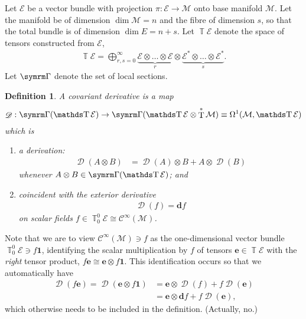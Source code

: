 \documentclass{article}
\newtheorem{definition}{Definition}
\DeclareMathOperator{\D}{\mathscr{D}}
\DeclareMathOperator{\T}{T}
\DeclareMathOperator{\TT}{\mathds T}
\renewcommand{\cal}{\mathcal}
\newcommand{\Cinf}{\cal C^\infty(\cal M)}
\renewcommand{\dd}{{\mathbf d}}
\DeclareMathOperator{\secs}{\symrm\Gamma}
\begin{document}
Let $\cal E$ be a vector bundle with projection $π : \cal E \to \cal M$ onto base manifold $\cal M$.
Let the manifold be of dimension $\dim\cal M = n$ and the fibre of dimension $s$, so that the total bundle is of dimension $\dim E = n + s$.
Let $\TT\cal E$ denote the space of tensors constructed from $\cal E$,
\begin{align}
	\TT\cal E = \bigoplus_{r,s=0}^\infty \underbrace{\cal E \otimes \dots \otimes \cal E}_r \otimes \underbrace{\cal E^* \otimes \dots \otimes \cal E^*}_s
.\end{align}
Let $\secs$ denote the set of local sections.
\begin{definition}
	A \emph{covariant derivative} is a map
	\begin{align}
		\D : \secs(\TT\cal E) \to \secs(\TT\cal E \otimes \T^*\cal M) \equiv \Omega^1(\cal M, \TT\cal E)
	\end{align}
	which is
	\begin{enumerate}
		\item a derivation:
		\begin{align}
			\D(A\otimes B) &= \D(A)\otimes B + A\otimes \D(B)
		\end{align}
		whenever $A\otimes B \in \secs(\TT \cal E)$; and

		\item coincident with the exterior derivative
		\begin{align}
			\D(f) = \dd f %
		\end{align}
		on scalar fields $f \in \TT^0_0\cal E \cong \Cinf$.
	\end{enumerate}
\end{definition}
Note that we are to view $\Cinf \ni f$ as the one-dimensional vector bundle $\TT^0_0\cal E \ni f\symbf 1$, identifying the scalar multiplication by $f$ of tensors $\symbf e \in \TT\cal E$ with the \emph{right} tensor product, $f\symbf e \cong \symbf e \otimes f\symbf 1$.
This identification occurs so that we automatically have
\begin{align}
	\D(f\symbf e) = \D(\symbf e \otimes f\symbf 1)
	&= \symbf e\otimes \D(f) + f\D(\symbf e)
\\	&= \symbf e \otimes \dd f + f\D(\symbf e)
,\end{align}
which otherwise needs to be included in the definition. (Actually, no.)
\end{document}
